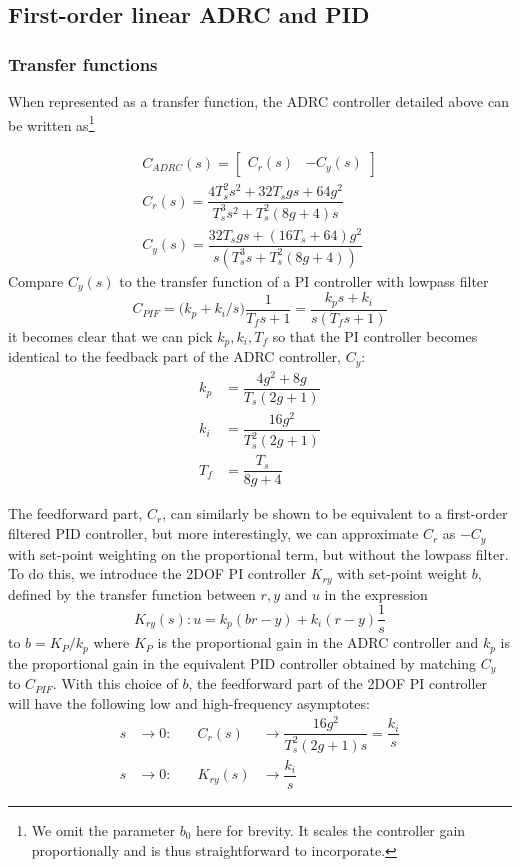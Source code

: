 \documentclass[letterpaper, 10 pt, conference]{ieeeconf}
\newcommand{\bmatrixx}[1]{\begin{bmatrix}#1\end{bmatrix}}
\begin{document}
\subsection{First-order linear ADRC and PID}
\subsubsection{Transfer functions}

When represented as a transfer function, the ADRC controller detailed above can be written as\footnote{We omit the parameter $b_0$ here for brevity. It scales the controller gain proportionally and is thus straightforward to incorporate.}




\begin{align}
	C_{ADRC}(s) = \bmatrixx{C_r(s) & -C_y(s)}\\
	C_r(s) = \dfrac{4T_{s}^2s^2 + 32T_{s}gs + 64g^2}{T_{s}^3s^2 + T_{s}^2(8g + 4)s} \\
	C_y(s) = \dfrac{32T_{s}gs + (16T_{s} + 64)g^2}{s(T_{s}^3s + T_{s}^2(8g + 4))}
\end{align}
 Compare $C_y(s)$ to the transfer function of a PI controller with lowpass filter
$$C_{PIF} = \big(k_p + k_i/s \big)\dfrac{1}{T_f s + 1} = \dfrac{k_p s + k_i}{s(T_f s + 1)}$$
it becomes clear that we can pick $k_p, k_i, T_f$ so that the PI controller becomes identical to the feedback part of the ADRC controller, $C_y$:
\begin{align}
	k_p &= \dfrac{4 g^2 + 8 g}{T_s(2 g + 1)} \label{eq:kp}\\
	k_i &= \dfrac{16 g^2}{T_s^2(2g + 1)} \label{eq:ki}\\
	T_f &= \dfrac{T_s}{8 g + 4} \label{eq:Tf}
\end{align}



The feedforward part, $C_r$, can similarly be shown to be equivalent to a first-order filtered PID controller, but more interestingly, we can approximate $C_r$ as $-C_y$ with set-point weighting on the proportional term, but without the lowpass filter. To do this, we introduce the 2DOF PI controller $K_{ry}$ with set-point weight $b$, defined by the transfer function between $r,y$ and $u$ in the expression
$$K_{ry}(s) : u = k_p (br - y) + k_i(r-y)\frac{1}{s}$$
to $b = K_P / k_p$ where $K_P$ is the proportional gain in the ADRC controller and $k_p$ is the proportional gain in the equivalent PID controller obtained by matching $C_y$ to $C_{PIF}$. With this choice of $b$, the feedforward part of the 2DOF PI controller will have the following low and high-frequency asymptotes:
\begin{align}
	s &\to 0:  & \quad C_r(s) &\to \dfrac{16g^2}{T_{s}^2(2g + 1)s} = \dfrac{k_i}{s}  \\
	s &\to 0:  & \quad K_{ry}(s) &\to \dfrac{k_i}{s} 
\end{align}
\end{document}
